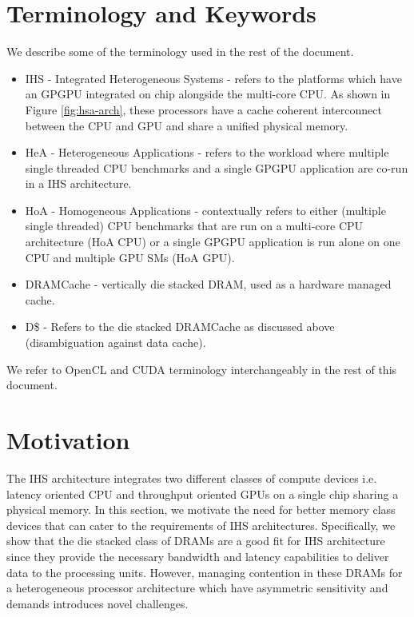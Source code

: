 \section{Terminology and Keywords}
We describe some of the terminology used in the rest of the document.
\begin{itemize}
	\item IHS - Integrated Heterogeneous Systems - refers to the platforms which have an GPGPU integrated on chip alongside the multi-core CPU. As shown in Figure \ref{fig:hsa-arch}, these processors have a cache coherent interconnect between the CPU and GPU and share a unified physical memory.
	\item HeA - Heterogeneous Applications - refers to the workload where multiple single threaded CPU benchmarks and a single GPGPU application are co-run in a IHS architecture.
	\item HoA - Homogeneous Applications - contextually refers to either (multiple single threaded) CPU benchmarks that are run on a multi-core CPU architecture (HoA CPU) or a single GPGPU application is run alone on one CPU and multiple GPU SMs (HoA GPU).
	\item DRAMCache - vertically die stacked DRAM, used as a hardware managed cache.
	\item D\$ - Refers to the die stacked DRAMCache as discussed above (disambiguation against data cache).
\end{itemize}
We refer to OpenCL \cite{opencl} and CUDA \cite{cuda} terminology interchangeably in the rest of this document.

\section{Motivation} \label{motivation}
The IHS architecture integrates two different classes of compute devices i.e. latency oriented CPU and throughput oriented GPUs on a single chip sharing a physical memory. In this section, we motivate the need for better memory class devices that can cater to the requirements of IHS architectures. Specifically, we show that the die stacked class of DRAMs are a good fit for IHS architecture since they provide the necessary bandwidth and latency capabilities to deliver data to the processing units. However, managing contention in these DRAMs for a heterogeneous processor architecture which have asymmetric sensitivity and demands introduces novel challenges.

